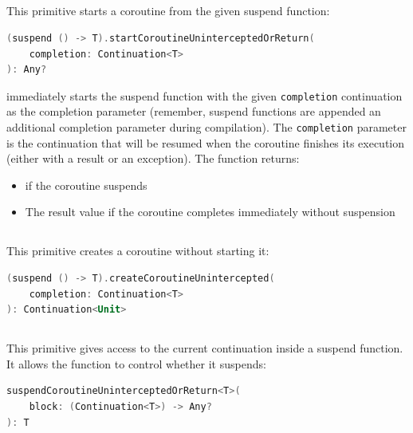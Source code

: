 \subsection*{\startCoroutineUninterceptedOrReturn}

This primitive starts a coroutine from the given suspend function:

\begin{lstlisting}[language=Kotlin, basicstyle=\small\ttfamily]
(suspend () -> T).startCoroutineUninterceptedOrReturn(
    completion: Continuation<T>
): Any?
\end{lstlisting}

\startCoroutineUninterceptedOrReturn immediately starts the suspend function with the given \texttt{completion}
continuation as the completion parameter (remember, suspend functions are appended an additional completion parameter
during compilation). The \texttt{completion} parameter is the continuation that will be resumed when the coroutine
finishes its execution (either with a result or an exception).
The function \startCoroutineUninterceptedOrReturn returns:
\begin{itemize}
    \item \COROUTINESUSPENDED if the coroutine suspends
    \item The result value if the coroutine completes immediately without suspension
\end{itemize}

\subsection*{\createCoroutineUnintercepted}

This primitive creates a coroutine without starting it:

\begin{lstlisting}[language=Kotlin, basicstyle=\small\ttfamily]
(suspend () -> T).createCoroutineUnintercepted(
    completion: Continuation<T>
): Continuation<Unit>
\end{lstlisting}

\subsection*{\suspendCoroutineUninterceptedOrReturn}

This primitive gives access to the current continuation inside a suspend function. It allows the function
to control whether it suspends:

\begin{lstlisting}[language=Kotlin, basicstyle=\small\ttfamily]
suspendCoroutineUninterceptedOrReturn<T>(
    block: (Continuation<T>) -> Any?
): T
\end{lstlisting}

